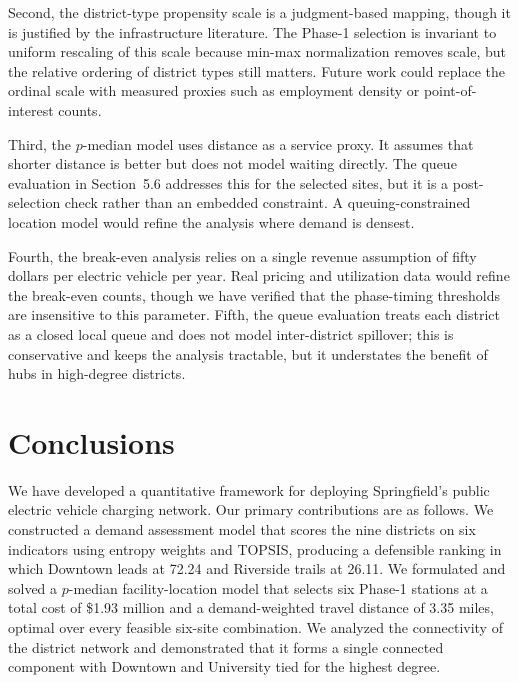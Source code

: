 \documentclass[11pt]{article}
\begin{document}
Second, the district-type propensity scale is a judgment-based mapping, though it is justified by the infrastructure literature. The Phase-1 selection is invariant to uniform rescaling of this scale because min-max normalization removes scale, but the relative ordering of district types still matters. Future work could replace the ordinal scale with measured proxies such as employment density or point-of-interest counts.

Third, the $p$-median model uses distance as a service proxy. It assumes that shorter distance is better but does not model waiting directly. The queue evaluation in Section~5.6 addresses this for the selected sites, but it is a post-selection check rather than an embedded constraint. A queuing-constrained location model would refine the analysis where demand is densest.

Fourth, the break-even analysis relies on a single revenue assumption of fifty dollars per electric vehicle per year. Real pricing and utilization data would refine the break-even counts, though we have verified that the phase-timing thresholds are insensitive to this parameter. Fifth, the queue evaluation treats each district as a closed local queue and does not model inter-district spillover; this is conservative and keeps the analysis tractable, but it understates the benefit of hubs in high-degree districts.

\section{Conclusions}

We have developed a quantitative framework for deploying Springfield's public electric vehicle charging network. Our primary contributions are as follows. We constructed a demand assessment model that scores the nine districts on six indicators using entropy weights and TOPSIS, producing a defensible ranking in which Downtown leads at 72.24 and Riverside trails at 26.11. We formulated and solved a $p$-median facility-location model that selects six Phase-1 stations at a total cost of \$1.93 million and a demand-weighted travel distance of 3.35 miles, optimal over every feasible six-site combination. We analyzed the connectivity of the district network and demonstrated that it forms a single connected component with Downtown and University tied for the highest degree.
\end{document}

